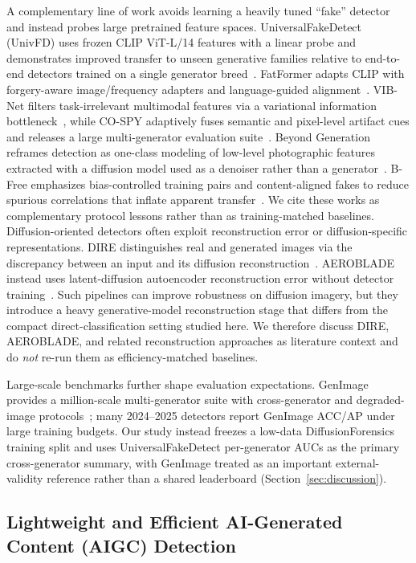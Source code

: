 A complementary line of work avoids learning a heavily tuned ``fake'' detector and instead probes large pretrained feature spaces.
UniversalFakeDetect (UnivFD) uses frozen CLIP ViT-L/14 features with a linear probe and demonstrates improved transfer to unseen generative families relative to end-to-end detectors trained on a single generator breed~\cite{ojha2023ufd}.
FatFormer adapts CLIP with forgery-aware image/frequency adapters and language-guided alignment~\cite{liu2024fatformer}.
VIB-Net filters task-irrelevant multimodal features via a variational information bottleneck~\cite{zhang2025vib}, while CO-SPY adaptively fuses semantic and pixel-level artifact cues and releases a large multi-generator evaluation suite~\cite{cheng2025cospy}.
Beyond Generation reframes detection as one-class modeling of low-level photographic features extracted with a diffusion model used as a denoiser rather than a generator~\cite{zhong2025beyond}.
B-Free emphasizes bias-controlled training pairs and content-aligned fakes to reduce spurious correlations that inflate apparent transfer~\cite{guillaro2025bfree}.
We cite these works as complementary protocol lessons rather than as training-matched baselines.
Diffusion-oriented detectors often exploit reconstruction error or diffusion-specific representations.
DIRE distinguishes real and generated images via the discrepancy between an input and its diffusion reconstruction~\cite{wang2023dire}.
AEROBLADE instead uses latent-diffusion autoencoder reconstruction error without detector training~\cite{ricker2024aeroblade}.
Such pipelines can improve robustness on diffusion imagery, but they introduce a heavy generative-model reconstruction stage that differs from the compact direct-classification setting studied here.
We therefore discuss DIRE, AEROBLADE, and related reconstruction approaches as literature context and do \emph{not} re-run them as efficiency-matched baselines.

Large-scale benchmarks further shape evaluation expectations.
GenImage provides a million-scale multi-generator suite with cross-generator and degraded-image protocols~\cite{zhu2023genimage}; many 2024--2025 detectors report GenImage ACC/AP under large training budgets.
Our study instead freezes a low-data DiffusionForensics training split and uses UniversalFakeDetect per-generator AUCs as the primary cross-generator summary, with GenImage treated as an important external-validity reference rather than a shared leaderboard (Section~\ref{sec:discussion}).

\subsection{Lightweight and Efficient AI-Generated Content (AIGC) Detection}
\label{sec:rw-lite}

